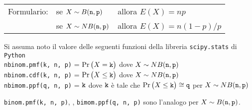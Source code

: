 \documentclass[11pt,twoside,a4paper]{article}
\begin{document}
\begin{tabular}{@{}lll}
Formulario:& se $X\sim B({\tt n},{\tt p})$ & allora $E(X)=np$\\
           & se $X\sim NB({\tt n},{\tt p})$& allora $E(X)=n(1-p)/p$
\end{tabular}

Si assuma noto il valore delle seguenti funzioni della libreria {\tt scipy.stats\/} di  {\tt Python\/}\\
{\tt nbinom.pmf(k, n, p)} = $\Pr\big(X={\tt k}\big)$ dove $X\sim NB({\tt n},{\tt p})$\\
{\tt nbinom.cdf(k, n, p)} = $\Pr\big(X\le{\tt k}\big)$ dove  $X\sim NB({\tt n},{\tt p})$ \\
{\tt nbimom.ppf(q, n, p)} = ${\tt k}$ dove ${\tt k}$ è tale che $\Pr\big(X\le{\tt k}\big)\cong{\tt q}$ per $X\sim NB({\tt n},{\tt p})$ 

{\tt binom.pmf(k, n, p)}, {\tt }, {\tt bimom.ppf(q, n, p)} sono l'analogo per $X\sim B({\tt n},{\tt p})$.
\end{document}
